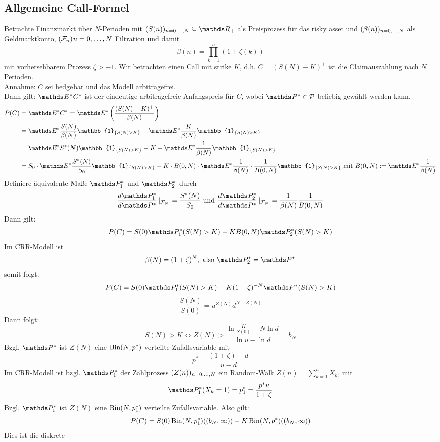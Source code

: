 \subsection{Allgemeine Call-Formel}
\label{sub:allg_call-formel}
Betrachte Finanzmarkt über $N$-Perioden mit $(S(n))_{n=0\dt{,}N}\subseteq \R_+$ als Preisprozess für das risky asset und $(\beta(n))_{n=0, \dots ,N}$ als Geldmarktkonto, $(\mathcal{F}_n){n=0, \dots ,N}$ Filtration und damit
\[
\beta(n)=\prod_{k=1}^{n}(1+\zeta(k))
\]
mit vorhersehbarem Prozess $\zeta>-1$.
Wir betrachten einen Call mit strike $K$, d.h. $C=(S(N)-K)^+$ ist die Claimauszahlung nach $N$ Perioden.\\
Annahme: $C$ sei hedgebar und das Modell arbitragefrei.\\
Dann gilt: $\E^*C^*$ ist der eindeutige arbitragefreie Anfangspreis für $C$, wobei $\Pw^*\in \mc{P}$ beliebig gewählt werden kann.
\begin{equation*}
\begin{aligned}
	P(C)&=\E^*C^*=\E^*\enbrace{\frac{(S(N)-K)^+}{\beta(N)}}\\
	&= \E^*\frac{S(N)}{\beta(N)}\mathbb{1}_{\penbrace{S(N)>K}}-\E^*\frac{K}{\beta(N)}\mathbb{1}_{\penbrace{S(N)>K}}\\
	&= \E^*S^*(N)\mathbb{1}_{\penbrace{S(N)>K}}-K-\E^*\frac{1}{\beta(N)}\mathbb{1}_{\penbrace{S(N)>K}}\\
	&= S_0\cdot \E^*\frac{S^*(N)}{S_0}\mathbb{1}_{\penbrace{S(N)>K}}-K\cdot B(0,N)\cdot \E^*\frac{1}{\beta(N)}\cdot\frac{1}{B(0,N)}\mathbb{1}_{\penbrace{S(N)>K}} \text{ mit } B(0,N):=\E^*\frac{1}{\beta(N)}
\end{aligned}
\end{equation*}
Definiere äquivalente Maße $\Pw_1^*$ und $\Pw_2^*$ durch
\[
\frac{d\Pw_1^*}{d\Pw^*}\left|_{\F_N}\right.=\frac{S^*(N)}{S_0}\text{ und }\frac{d\Pw_2^*}{d\Pw^*}\left|_{\F_N}\right.=\frac{1}{\beta(N)}\frac{1}{B(0,N)}
\]
Dann gilt:
\[
P(C)=S(0)\Pw_1^*(S(N)>K)-KB(0,N)\Pw_2^*(S(N)>K)
\]
Im CRR-Modell ist
\[
\beta(N)=(1+\zeta)^N,\text{ also }\Pw_2^*=\Pw^*
\]
somit folgt:
\[
P(C)=S(0)\Pw_1^*(S(N)>K)-K(1+\zeta)^{-N}\Pw^*(S(N)>K)
\]
\[
\frac{S(N)}{S(0)}=u^{Z(N)}d^{N-Z(N)}
\]
Dann folgt:
\[
S(N)>K\Leftrightarrow Z(N)>\frac{\ln\frac{K}{S(0)}-N\ln d}{\ln u-\ln d}=b_N
\]
Bzgl. $\Pw^*$ ist $Z(N)$ eine $\operatorname{Bin}(N,p^*)$ verteilte Zufallsvariable mit
\[
p^*=\frac{(1+\zeta)-d}{u-d}
\]
Im CRR-Modell ist bzgl. $\Pw_1^*$ der Zählprozess $(Z(n))_{n=0, \dots ,N}$ ein Random-Walk $Z(n)=\sum_{k=1}^{n}X_k$, mit 
\[
\Pw_1^*(X_k=1)=p_1^*=\frac{p^*u}{1+\zeta}
\]
Bzgl. $\Pw_1^*$ ist $Z(N)$ eine $\operatorname{Bin}(N,p_1^*)$ verteilte Zufallsvariable. Also gilt:
\[
P(C)=S(0)\operatorname{Bin}(N,p_1^*)((b_N,\infty))-K\operatorname{Bin}(N,p^*)((b_N,\infty))
\]
Dies ist die diskrete 
\newpage

